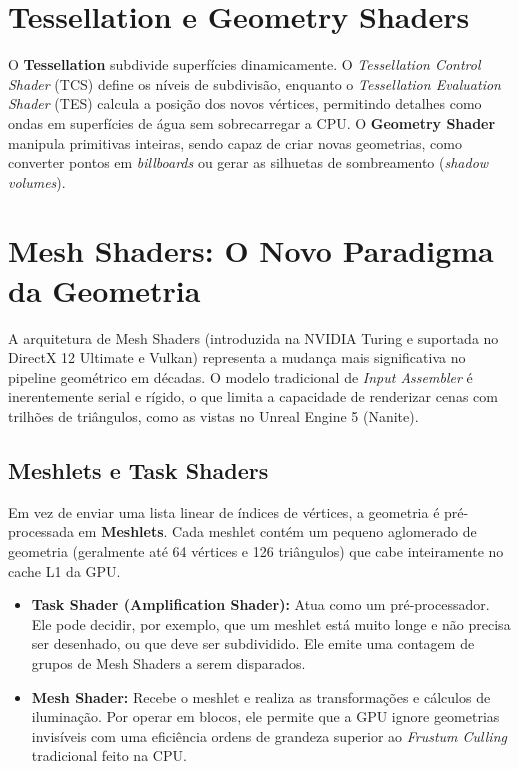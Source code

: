 \section{Tessellation e Geometry Shaders}

O \textbf{Tessellation} subdivide superfícies dinamicamente. O \textit{Tessellation Control Shader} (TCS) define os níveis de subdivisão, enquanto o \textit{Tessellation Evaluation Shader} (TES) calcula a posição dos novos vértices, permitindo detalhes como ondas em superfícies de água sem sobrecarregar a CPU. O \textbf{Geometry Shader} manipula primitivas inteiras, sendo capaz de criar novas geometrias, como converter pontos em \textit{billboards} ou gerar as silhuetas de sombreamento (\textit{shadow volumes}).

\section{Mesh Shaders: O Novo Paradigma da Geometria}

A arquitetura de Mesh Shaders (introduzida na NVIDIA Turing e suportada no DirectX 12 Ultimate e Vulkan) representa a mudança mais significativa no pipeline geométrico em décadas. O modelo tradicional de \textit{Input Assembler} é inerentemente serial e rígido, o que limita a capacidade de renderizar cenas com trilhões de triângulos, como as vistas no Unreal Engine 5 (Nanite).

\subsection{Meshlets e Task Shaders}

Em vez de enviar uma lista linear de índices de vértices, a geometria é pré-processada em \textbf{Meshlets}. Cada meshlet contém um pequeno aglomerado de geometria (geralmente até 64 vértices e 126 triângulos) que cabe inteiramente no cache L1 da GPU.
\begin{itemize}
    \item \textbf{Task Shader (Amplification Shader):} Atua como um pré-processador. Ele pode decidir, por exemplo, que um meshlet está muito longe e não precisa ser desenhado, ou que deve ser subdividido. Ele emite uma contagem de grupos de Mesh Shaders a serem disparados.
    \item \textbf{Mesh Shader:} Recebe o meshlet e realiza as transformações e cálculos de iluminação. Por operar em blocos, ele permite que a GPU ignore geometrias invisíveis com uma eficiência ordens de grandeza superior ao \textit{Frustum Culling} tradicional feito na CPU.
\end{itemize}

